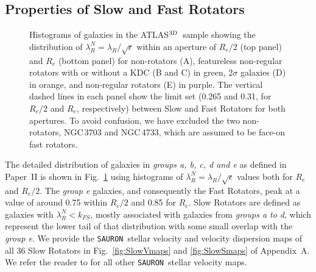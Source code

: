 \documentclass[useAMS,usenatbib,usegraphicx]{mn2e}
\newcommand{\Sauron}{\texttt{SAURON}}
\newcommand{\atlas}{{ATLAS$^{\rm 3D}$}}
\begin{document}
\subsection{Properties of Slow and Fast Rotators}
\label{sec:propFS}
\begin{figure}
\centering
{}
\caption{Histograms of galaxies in the \atlas\ sample showing the distribution
of ${\lambda_R^N} = {\lambda_R} / \sqrt{\epsilon}$ within an aperture of $R_e
/2$ (top panel) and $R_e$ (bottom panel) for non-rotators (A), 
featureless non-regular rotators with or without a KDC (B and C) in green, 2$\sigma$ galaxies (D) 
in orange, and non-regular rotators (E) in purple. The vertical dashed lines in each
panel show the limit set (0.265 and 0.31, for $R_e/2$ and $R_e$, respectively) between Slow and Fast Rotators for
both apertures. To avoid confusion, we have excluded the two non-rotators,
NGC\,3703 and NGC\,4733, which are assumed to be face-on fast rotators.}
\label{fig:HistLStar}
\end{figure}

The detailed distribution of galaxies in {\em groups a, b, c, d and e}
as defined in Paper~II is shown in Fig.~\ref{fig:HistLStar} using
histograms of ${\lambda_R^N} = {\lambda_R} / \sqrt{\epsilon}$ values both for
$R_e$ and $R_e/2$. The {\em group e} galaxies, and
consequently the Fast Rotators, peak at a value of around 0.75 within $R_e/2$
and 0.85 for $R_e$. Slow Rotators are defined as galaxies with ${\lambda_R^N} < k_{FS}$, mostly associated 
with galaxies from {\em groups a to d}, which represent the lower tail of that distribution with
some small overlap with the {\em group e}.  We provide the \Sauron\ stellar velocity and velocity
dispersion maps of all 36 Slow Rotators in Fig.~\ref{fig:SlowVmaps} and
\ref{fig:SlowSmaps} of Appendix~A. We refer the reader to \cite{Krajnovic+11}
for all other \Sauron\ stellar velocity maps.
\end{document}
